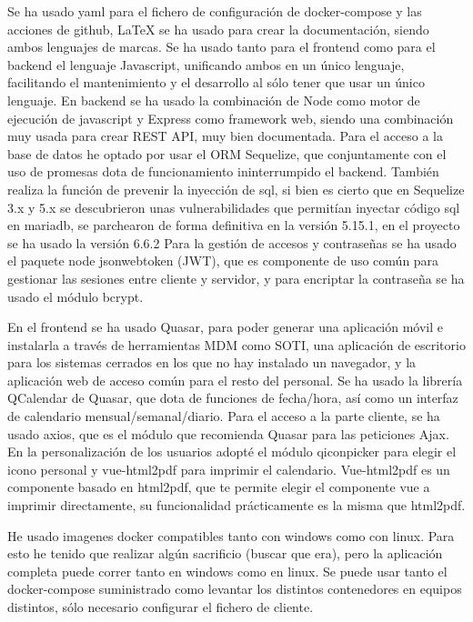 \documentclass[11pt,spanish,listoffigures,listoftables]{tfgetsinf}
\begin{document}
Se ha usado yaml para el fichero de configuración de docker-compose y las acciones de github, \LaTeX{} se ha usado para crear la documentación, siendo ambos lenguajes de marcas.
Se ha usado tanto para el frontend como para el backend el lenguaje Javascript, unificando ambos en un único lenguaje, facilitando el mantenimiento y el desarrollo al sólo tener que usar un único lenguaje.
En backend se ha usado la combinación de Node como motor de ejecución de javascript y Express como framework web, siendo una combinación muy usada para crear REST API, muy bien documentada.
Para el acceso a la base de datos he optado por usar el ORM Sequelize, que conjuntamente con el uso de promesas dota de funcionamiento ininterrumpido el backend. 
También realiza la función de prevenir la inyección de sql, si bien es cierto que en Sequelize 3.x y 5.x se descubrieron unas vulnerabilidades que permitían inyectar código sql en mariadb, se parchearon de forma definitiva en la versión 5.15.1, en el proyecto se ha usado la versión 6.6.2
Para la gestión de accesos y contraseñas se ha usado el paquete node jsonwebtoken (JWT), que es componente de uso común para gestionar las sesiones entre cliente y servidor, y para encriptar la contraseña se ha usado el módulo bcrypt.

En el frontend se ha usado Quasar, para poder generar una aplicación móvil e instalarla a través de herramientas MDM como SOTI, una aplicación de escritorio para los sistemas cerrados en los que no hay instalado un navegador, y la aplicación web de acceso común para el resto del personal.
Se ha usado la librería QCalendar de Quasar, que dota de funciones de fecha/hora, así como un interfaz de calendario mensual/semanal/diario.
Para el acceso a la parte cliente, se ha usado axios, que es el módulo que recomienda Quasar para las peticiones Ajax.
En la personalización de los usuarios adopté el módulo qiconpicker para elegir el icono personal y vue-html2pdf para imprimir el calendario. Vue-html2pdf es un componente basado en html2pdf, que te permite elegir el componente vue a imprimir directamente, su funcionalidad prácticamente es la misma que html2pdf.

He usado imagenes docker compatibles tanto con windows como con linux. Para esto he tenido que realizar algún sacrificio (buscar que era), pero la aplicación completa puede correr tanto en windows como en linux.
Se puede usar tanto el docker-compose suministrado como levantar los distintos contenedores en equipos distintos, sólo necesario configurar el fichero de cliente.
\end{document}
